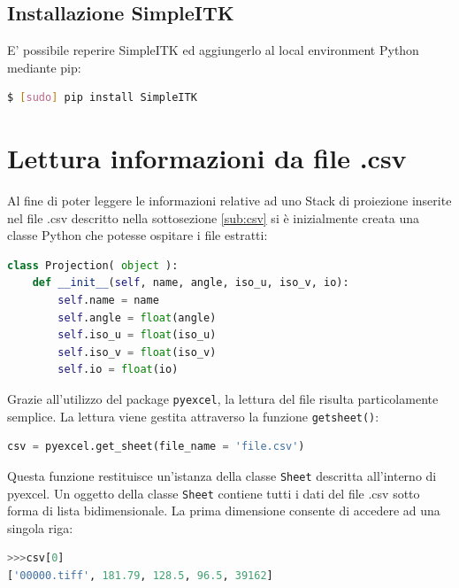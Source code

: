 \documentclass[a4paper,12pt, doubleside]{report}
\begin{document}
                \subsection{Installazione SimpleITK}
                    E' possibile reperire SimpleITK ed aggiungerlo al local environment Python mediante pip:
                \begin{lstlisting}[language=bash, frame=bt]
$ [sudo] pip install SimpleITK
                    \end{lstlisting}
                        
        \section{Lettura informazioni da file .csv}
            \label{sec:lettura-csv}
            Al fine di poter leggere le informazioni relative ad uno Stack di proiezione inserite nel file .csv descritto nella sottosezione \ref{sub:csv} si è inizialmente creata una classe Python che potesse ospitare i file estratti:
            
            \begin{lstlisting}[language=python, frame=bt]
class Projection( object ):
    def __init__(self, name, angle, iso_u, iso_v, io):
        self.name = name
        self.angle = float(angle)
        self.iso_u = float(iso_u)
        self.iso_v = float(iso_v)
        self.io = float(io)
            \end{lstlisting}
            
            Grazie all'utilizzo del package \texttt{pyexcel}, la lettura del file risulta particolamente semplice.
            La lettura viene gestita attraverso la funzione \texttt{get\textunderscore sheet()}:
            
            \begin{lstlisting}[language=python, frame=bt]
csv = pyexcel.get_sheet(file_name = 'file.csv')
            \end{lstlisting}
            
            Questa funzione restituisce un'istanza della classe \texttt{Sheet} descritta all'interno di pyexcel.
            Un oggetto della classe \texttt{Sheet} contiene tutti i dati del file .csv sotto forma di lista bidimensionale.\cite{pyexcel-docs} La prima dimensione consente di accedere ad una singola riga:
            
            \begin{lstlisting}[language=python, frame=bt]
>>>csv[0]
['00000.tiff', 181.79, 128.5, 96.5, 39162]
            \end{lstlisting}
            
\end{document}
